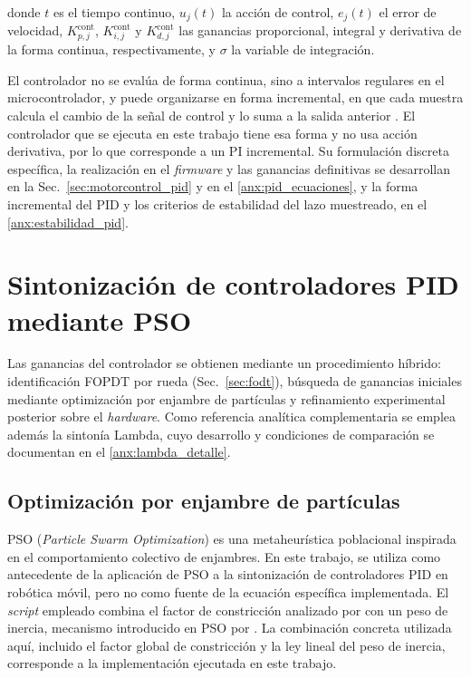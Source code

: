\noindent donde $t$ es el tiempo continuo, $u_j(t)$ la acción de control, $e_j(t)$ el error de velocidad, $K_{p,j}^{\mathrm{cont}}$, $K_{i,j}^{\mathrm{cont}}$ y $K_{d,j}^{\mathrm{cont}}$ las ganancias proporcional, integral y derivativa de la forma continua, respectivamente, y $\sigma$ la variable de integración.

El controlador no se evalúa de forma continua, sino a intervalos regulares en
el microcontrolador, y puede organizarse en forma incremental, en que cada
muestra calcula el cambio de la señal de control y lo suma a la salida anterior
\citep[Sec.~13.4]{astrom2009controlpid}. El controlador que se ejecuta en este
trabajo tiene esa forma y no usa acción derivativa, por lo que corresponde a un
PI incremental. Su formulación discreta específica, la
realización en el \textit{firmware} y las ganancias definitivas se desarrollan
en la Sec.~\ref{sec:motorcontrol_pid} y en el \ref{anx:pid_ecuaciones}, y la
forma incremental del PID y los criterios de estabilidad del lazo muestreado,
en el \ref{anx:estabilidad_pid}.

\section{Sintonización de controladores PID mediante PSO}
\label{sec:sintonizacion}

Las ganancias del controlador se obtienen mediante un procedimiento híbrido:
identificación FOPDT por rueda (Sec.~\ref{sec:fodt}), búsqueda de ganancias
iniciales mediante optimización por enjambre de partículas y refinamiento
experimental posterior sobre el \textit{hardware}. Como referencia analítica
complementaria se emplea además la sintonía Lambda, cuyo desarrollo y
condiciones de comparación se documentan en el \ref{anx:lambda_detalle}.

\subsection{Optimización por enjambre de partículas}
\label{sec:pso_marco}

PSO (\textit{Particle Swarm Optimization}) es una metaheurística
poblacional inspirada en el comportamiento colectivo de enjambres. En este
trabajo, \citet{gokcce2021particle} se utiliza como antecedente de la
aplicación de PSO a la sintonización de controladores PID en robótica móvil,
pero no como fuente de la ecuación específica implementada. El \textit{script} empleado
combina el factor de constricción analizado por \citet{clerc2002particle} con
un peso de inercia, mecanismo introducido en PSO por
\citet{shi1998modified}. La combinación concreta utilizada aquí, incluido el
factor global de constricción y la ley lineal del peso de inercia, corresponde
a la implementación ejecutada en este trabajo.

